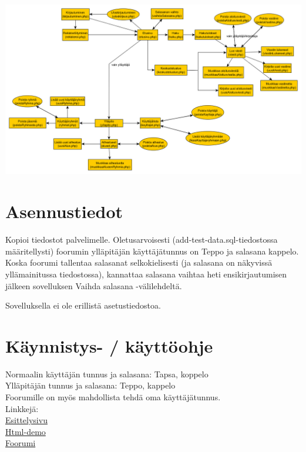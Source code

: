 \documentclass[12pt,a4paper,leqno]{report}
\begin{document}
\begin{sideways}
\includegraphics[scale=.55]{sivukartta}
\end{sideways}

\chapter{Asennustiedot}

Kopioi tiedostot palvelimelle. Oletusarvoisesti (add-test-data.sql-tiedostossa määritellysti) foorumin ylläpitäjän käyttäjätunnus on Teppo ja salasana kappelo. Koska foorumi tallentaa salasanat selkokielisesti (ja salasana on näkyvissä yllämainitussa tiedostossa), kannattaa salasana vaihtaa heti ensikirjautumisen jälkeen sovelluksen Vaihda salasana -välilehdeltä.

Sovelluksella ei ole erillistä asetustiedostoa.

\chapter{Käynnistys- / käyttöohje}

Normaalin käyttäjän tunnus ja salasana: Tapsa, koppelo\\
Ylläpitäjän tunnus ja salasana: Teppo, kappelo\\

\noindent Foorumille on myös mahdollista tehdä oma käyttäjätunnus.\\

\noindent Linkkejä:\\
\href{http://wlehtoma.users.cs.helsinki.fi/Keskustelufoorumi/esittelysivu.html}{Esittelysivu}\\
\href{http://wlehtoma.users.cs.helsinki.fi/Keskustelufoorumi/html-demo/}{Html-demo}\\
\href{http://wlehtoma.users.cs.helsinki.fi/Keskustelufoorumi/kirjautuminen.php}{Foorumi}
\end{document}
